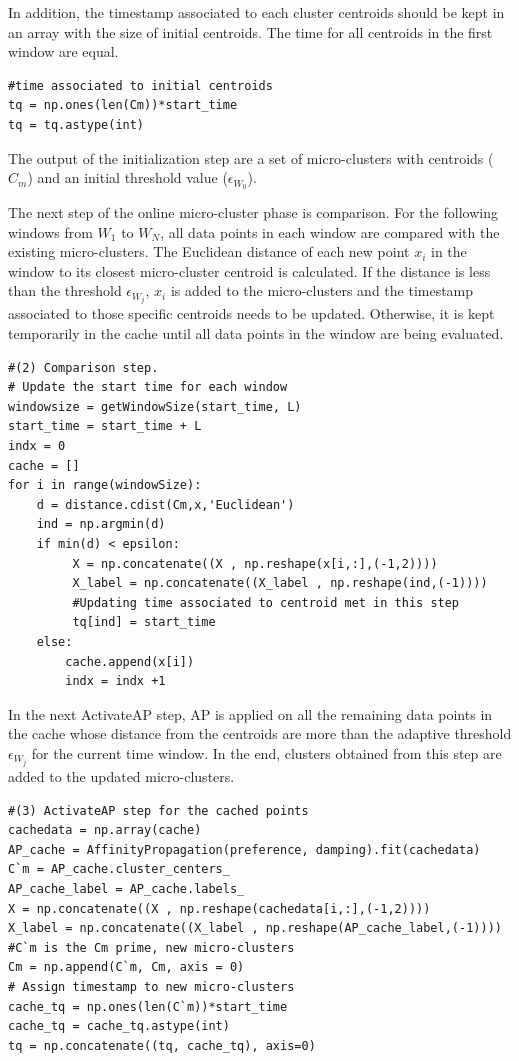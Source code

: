 In addition, the timestamp associated to each cluster centroids should be kept in an array with the size of initial centroids. The time for all centroids in the first window are equal.

\begin{lstlisting}
#time associated to initial centroids
tq = np.ones(len(Cm))*start_time
tq = tq.astype(int)
\end{lstlisting}


The output of the initialization step are a set of micro-clusters with centroids ($C_m$) and an initial threshold value ($\epsilon_{W_0}$).

The next step of the online micro-cluster phase is comparison. For the following windows from $W_1$ to $W_N$, all data points in each window are compared with the existing micro-clusters. The Euclidean distance of each new point $x_i$ in the window to its closest micro-cluster centroid is calculated. If the distance is less than the threshold $\epsilon_{W_j}$, $x_i$ is added to the micro-clusters and the timestamp associated to those specific centroids needs to be updated. Otherwise, it is kept temporarily in the cache until all data points in the window are being evaluated. 

\begin{lstlisting}
#(2) Comparison step.
# Update the start time for each window
windowsize = getWindowSize(start_time, L)
start_time = start_time + L
indx = 0
cache = []
for i in range(windowSize):
    d = distance.cdist(Cm,x,'Euclidean')
    ind = np.argmin(d)    
    if min(d) < epsilon:
         X = np.concatenate((X , np.reshape(x[i,:],(-1,2))))
         X_label = np.concatenate((X_label , np.reshape(ind,(-1))))
         #Updating time associated to centroid met in this step
         tq[ind] = start_time
    else:
        cache.append(x[i])       
        indx = indx +1
\end{lstlisting}


In the next ActivateAP step, AP is applied on all the remaining data points in the cache whose distance from the centroids are more than the adaptive threshold $\epsilon_{W_j}$ for the current time window. In the end, clusters obtained from this step are added to the updated micro-clusters.  


\begin{lstlisting}
#(3) ActivateAP step for the cached points
cachedata = np.array(cache)        
AP_cache = AffinityPropagation(preference, damping).fit(cachedata)
C`m = AP_cache.cluster_centers_
AP_cache_label = AP_cache.labels_
X = np.concatenate((X , np.reshape(cachedata[i,:],(-1,2))))
X_label = np.concatenate((X_label , np.reshape(AP_cache_label,(-1))))
#C`m is the Cm prime, new micro-clusters
Cm = np.append(C`m, Cm, axis = 0)
# Assign timestamp to new micro-clusters
cache_tq = np.ones(len(C`m))*start_time
cache_tq = cache_tq.astype(int)
tq = np.concatenate((tq, cache_tq), axis=0)
\end{lstlisting}


